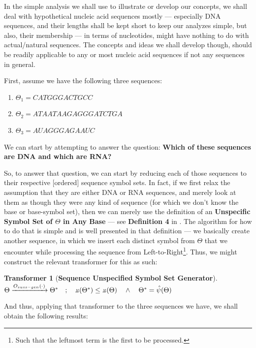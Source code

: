\documentclass[a4paper, 18pt]{article} %
\newtheorem{transf}{Transformer}
\newcommand{\invpi}{\rotatebox[origin=c]{180}{$\pi$}}
\begin{document}
In the simple analysis we shall use to illustrate or develop our concepts, we shall deal with hypothetical nucleic acid sequences mostly --- especially DNA sequences, and their lengths shall be kept short to keep our analyzes simple, but also, their membership --- in terms of nucleotides, might have nothing to do with actual/natural sequences. The concepts and ideas we shall develop though, should be readily applicable to any or most nucleic acid sequences if not any sequences in general.

First, assume we have the following three sequences:

\begin{enumerate}
\item $\Theta_1 = CATGGGACTGCC$
\item $\Theta_2 = ATAATAAGAGGGATCTGA$
\item $\Theta_3 = AUAGGGAGAAUC$
\end{enumerate}

We can start by attempting to answer the question: \textbf{Which of these sequences are DNA and which are RNA?}

So, to answer that question, we can start by reducing each of those sequences to their respective [ordered] sequence symbol sets. In fact, if we first relax the assumption that they are either DNA or RNA sequences, and merely look at them as though they were any kind of sequence (for which we don't know the base or base-symbol set), then we can merely use the definition of an \textbf{Unspecific Symbol Set of $\Theta$ in Any Base} --- see \textbf{Definition 4} in \cite{ossipaper}. The algorithm for how to do that is simple and is well presented in that definition --- we basically create another sequence, in which we insert each distinct symbol from $\Theta$ that we encounter while processing the sequence from Left-to-Right\footnote{Such that the leftmost term is the first to be processed.}. Thus, we might construct the relevant transformer for this as such:

\begin{transf}[\textbf{Sequence Unspecified Symbol Set Generator}]
\label{TRANSSSGEN}$ $\\
$\Theta \xrightarrow{O_{suss-gen}(\cdot)} \Theta^* \quad;\quad \invpi(\Theta^*) \leq \invpi(\Theta) \quad \land \quad \Theta^* = \hat{\psi}(\Theta)$
\end{transf}

And thus, applying that transformer to the three sequences we have, we shall obtain the following results:
\end{document}
